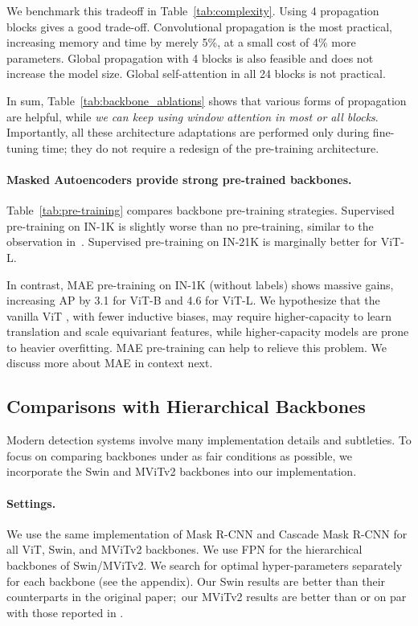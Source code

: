 \documentclass[runningheads]{llncs}
\newcommand{\boxAP}{AP\xspace}
\begin{document}
We benchmark this tradeoff in Table~\ref{tab:complexity}.
Using 4 propagation blocks gives a good trade-off. Convolutional propagation is the most practical, increasing memory and time by merely 5\%, at a small cost of 4\% more parameters.
 Global propagation with 4 blocks is also feasible and does not increase the model size. Global self-attention in all 24 blocks is not practical.

In sum, Table~\ref{tab:backbone_ablations} shows that various forms of propagation are helpful, while \textit{we can keep using window attention in most or all blocks}.
 Importantly, all these architecture adaptations are performed only during fine-tuning time; they do not require a redesign of the pre-training architecture.

\paragraph{Masked Autoencoders provide strong pre-trained backbones.} Table~\ref{tab:pre-training} compares backbone pre-training strategies. Supervised pre-training on IN-1K is slightly worse than no pre-training, similar to the observation in~\cite{Ghiasi2021}. Supervised pre-training on IN-21K is marginally better for ViT-L.

In contrast, MAE \cite{He2021} pre-training on IN-1K (without labels) shows massive gains, increasing \boxAP by 3.1 for ViT-B and 4.6 for ViT-L. 
We hypothesize that the vanilla ViT \cite{Dosovitskiy2021}, with fewer inductive biases, may require higher-capacity to learn translation and scale equivariant features, while higher-capacity models are prone to heavier overfitting. MAE pre-training can help to relieve this problem. We discuss more about MAE in context next.

\subsection{Comparisons with Hierarchical Backbones} \label{subsec:vs_hier}

Modern detection systems involve many implementation details and subtleties. To focus on comparing backbones under as fair conditions as possible, we incorporate the Swin \cite{Liu2021} and MViTv2 \cite{Li2021a} backbones into our implementation.

\paragraph{Settings.} We use the same implementation of Mask R-CNN \cite{He2017} and Cascade Mask R-CNN \cite{Cai2019} for all ViT, Swin, and MViTv2 backbones. We use FPN for the hierarchical backbones of Swin/MViTv2. We search for optimal hyper-parameters separately for each backbone (see the appendix). Our Swin results are better than their counterparts in the original paper;\footnotemark~our MViTv2 results are better than or on par with those reported in \cite{Li2021a}.
\end{document}
